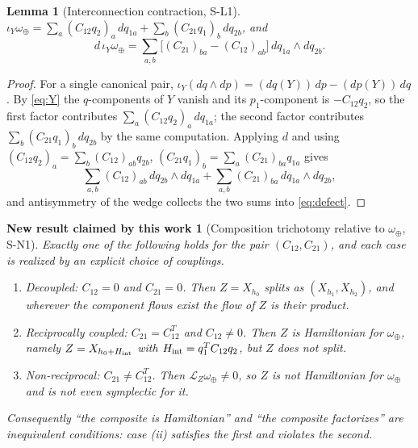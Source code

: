 \documentclass[11pt]{article}
\theoremstyle{plain}
\newtheorem{lemma}[definition]{Lemma}
\newtheorem{newresult}[definition]{New result claimed by this work}
\newcommand{\Lie}{\mathcal{L}}
\begin{document}
\begin{lemma}[Interconnection contraction, S-L1]
\label{lem:contraction}
$\displaystyle \iota_Y\omega_\oplus=\sum_{a}(C_{12}q_2)_a\,dq_{1a}
 +\sum_{b}(C_{21}q_1)_b\,dq_{2b}$, and
\begin{equation}\label{eq:defect}
 d\,\iota_Y\omega_\oplus=\sum_{a,b}\big[(C_{21})_{ba}-(C_{12})_{ab}\big]\,
 dq_{1a}\wedge dq_{2b}.
\end{equation}
\end{lemma}

\begin{proof}
For a single canonical pair, $\iota_Y(dq\wedge dp)=(dq(Y))\,dp-(dp(Y))\,dq$.
By \eqref{eq:Y} the $q$-components of $Y$ vanish and its $p_1$-component is
$-C_{12}q_2$, so the first factor contributes $\sum_a(C_{12}q_2)_a\,dq_{1a}$;
the second factor contributes $\sum_b(C_{21}q_1)_b\,dq_{2b}$ by the same
computation. Applying $d$ and using $(C_{12}q_2)_a=\sum_b(C_{12})_{ab}q_{2b}$,
$(C_{21}q_1)_b=\sum_a(C_{21})_{ba}q_{1a}$ gives
\[
 \sum_{a,b}(C_{12})_{ab}\,dq_{2b}\wedge dq_{1a}
 +\sum_{a,b}(C_{21})_{ba}\,dq_{1a}\wedge dq_{2b},
\]
and antisymmetry of the wedge collects the two sums into \eqref{eq:defect}.
\end{proof}

\begin{newresult}[Composition trichotomy relative to $\omega_\oplus$, S-N1]
\label{res:trichotomy}
Exactly one of the following holds for the pair $(C_{12},C_{21})$, and each case
is realized by an explicit choice of couplings.
\begin{enumerate}[label=(\roman*),leftmargin=2.2em]
\item \emph{Decoupled}: $C_{12}=0$ and $C_{21}=0$. Then $Z=X_{h_0}$ splits as
      $(X_{h_1},X_{h_2})$, and wherever the component flows exist the flow of
      $Z$ is their product.
\item \emph{Reciprocally coupled}: $C_{21}=C_{12}^{T}$ and $C_{12}\neq0$. Then
      $Z$ is Hamiltonian for $\omega_\oplus$, namely $Z=X_{h_0+H_{\rm int}}$ with
      $H_{\rm int}=q_1^{T}C_{12}q_2$, but $Z$ does not split.
\item \emph{Non-reciprocal}: $C_{21}\neq C_{12}^{T}$. Then
      $\Lie_Z\omega_\oplus\neq0$, so $Z$ is not Hamiltonian for $\omega_\oplus$
      and is not even symplectic for it.
\end{enumerate}
Consequently ``the composite is Hamiltonian'' and ``the composite factorizes''
are inequivalent conditions: case (ii) satisfies the first and violates the
second.
\end{newresult}
\end{document}
